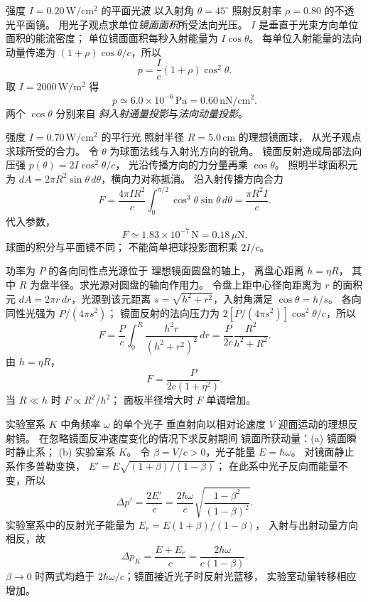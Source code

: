 强度 $I=0.20\,\mathrm{W/cm^2}$ 的平面光波
以入射角 $\theta=45^\circ$ 照射反射率
$\rho=0.80$ 的不透光平面镜。
用光子观点求单位\emph{镜面面积}所受法向光压。
\exsolution
$I$ 是垂直于光束方向单位面积的能流密度；
单位镜面面积每秒入射能量为 $I\cos\theta$。
每单位入射能量的法向动量传递为
$(1+\rho)\cos\theta/c$，所以
\[
 \boxed{p=\frac Ic(1+\rho)\cos^2\theta}.
\]
取 $I=2000\,\mathrm{W/m^2}$ 得
\[
 \boxed{p\simeq6.0\times10^{-6}\,\mathrm{Pa}
 =0.60\,\mathrm{nN/cm^2}}.
\]
\excheck 两个 $\cos\theta$ 分别来自
\emph{斜入射通量投影}与\emph{法向动量投影}。

强度 $I=0.70\,\mathrm{W/cm^2}$ 的平行光
照射半径 $R=5.0\,\mathrm{cm}$ 的理想镜面球，
从光子观点求球所受的合力。
\exsolution
令 $\theta$ 为球面法线与入射光方向的锐角。
镜面反射造成局部法向压强
$p(\theta)=2I\cos^2\theta/c$，
光沿传播方向的力分量再乘 $\cos\theta$。
照明半球面积元为
$dA=2\pi R^2\sin\theta\,d\theta$，横向力对称抵消。
沿入射传播方向合力
\[
 F=\frac{4\pi IR^2}{c}
 \int_0^{\pi/2}\cos^3\theta\sin\theta\,d\theta
 =\boxed{\frac{\pi R^2I}{c}}.
\]
代入参数，
\[
 \boxed{F\simeq1.83\times10^{-7}\,\mathrm N
 =0.18\,\mu\mathrm N}.
\]
\excheck 球面的积分与平面镜不同；
不能简单把球投影面积乘 $2I/c$。

功率为 $P$ 的各向同性点光源位于
理想镜面圆盘的轴上，
离盘心距离 $h=\eta R$，
其中 $R$ 为盘半径。求光源对圆盘的轴向作用力。
\exsolution
令盘上距中心径向距离为 $r$ 的面积元
$dA=2\pi r\,dr$，光源到该元距离
$s=\sqrt{h^2+r^2}$，入射角满足 $\cos\theta=h/s$。
各向同性光强为 $P/(4\pi s^2)$；
镜面反射的法向压力为
$2[P/(4\pi s^2)]\cos^2\theta/c$，所以
\[
 F=\frac{P}{c}\int_0^R
 \frac{h^2r}{(h^2+r^2)^2}\,dr
 =\frac{P}{2c}\frac{R^2}{h^2+R^2}.
\]
由 $h=\eta R$，
\[
 \boxed{F=\frac{P}{2c(1+\eta^2)}}.
\]
\excheck 当 $R\ll h$ 时 $F\propto R^2/h^2$；
面板半径增大时 $F$ 单调增加。

实验室系 $K$ 中角频率 $\omega$ 的单个光子
垂直射向以相对论速度 $V$ 迎面运动的理想反射镜。
在忽略镜面反冲速度变化的情况下求反射期间
镜面所获动量：(a) 镜面瞬时静止系；
(b) 实验室系 $K$。
\exsolution
令 $\beta=V/c>0$，光子能量 $E=\hbar\omega$。
对镜面静止系作多普勒变换，
$E'=E\sqrt{(1+\beta)/(1-\beta)}$；
在此系中光子反向而能量不变，所以
\[
 \boxed{\Delta p'=\frac{2E'}c
 =\frac{2\hbar\omega}{c}
 \sqrt{\frac{1-\beta^2}{(1-\beta)^2}}}.
\]
实验室系中的反射光子能量为
$E_r=E(1+\beta)/(1-\beta)$，
入射与出射动量方向相反，故
\[
 \boxed{\Delta p_K=\frac{E+E_r}{c}
 =\frac{2\hbar\omega}{c(1-\beta)}}.
\]
\excheck $\beta\to0$ 时两式均趋于
$2\hbar\omega/c$；镜面接近光子时反射光蓝移，
实验室动量转移相应增加。

